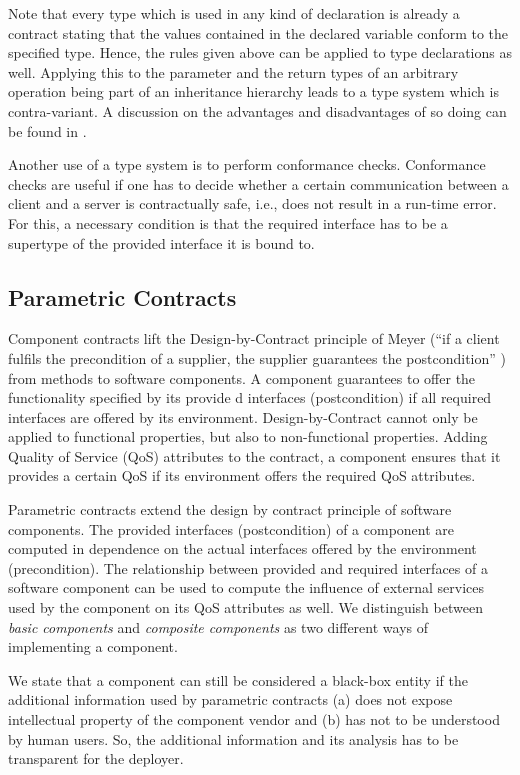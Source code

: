 Note that every type which is used in any kind of declaration is already a contract stating that the values contained in the declared variable conform to the specified type. Hence, the rules given above can be applied to type declarations as well. Applying this to the parameter and the return types of an arbitrary operation being part of an inheritance hierarchy leads to a type system which is contra-variant. A discussion on the advantages and disadvantages of so doing can be found in \cite[p. 628ff]{meyer1997a}.

Another use of a type system is to perform conformance checks. Conformance checks are useful if one has to decide whether a certain communication between a client and a server is contractually safe, i.e., does not result in a run-time error. For this, a necessary condition is that the required interface has to be a supertype of the provided interface it is bound to. 

\subsection{Parametric Contracts}

Component contracts lift the Design-by-Contract principle of Meyer (``if a
client fulfils the precondition of a supplier, the supplier guarantees the
postcondition'' \cite{meyer1992a}) from methods to software components. A
component guarantees to offer the functionality specified by its provide
d interfaces (postcondition) if all required interfaces are offered by its
environment. Design-by-Contract cannot only be applied to
functional properties, but also to non-functional properties. Adding Quality of
Service (QoS) attributes to the contract, a component ensures that it
provides a certain QoS if its environment offers the required QoS attributes. 

Parametric contracts \cite{reussner2002c} extend the design by contract
principle of software components. The provided interfaces (postcondition) of a
component are computed in dependence on the actual interfaces offered by the
environment (precondition). The relationship between provided and required
interfaces of a software component can be used to compute the influence of
external services used by the component on its QoS attributes as well. We
distinguish between \emph{basic components} and \emph{composite components} as
two different ways of implementing a component.

We state that a component can still be considered a black-box entity if the
additional information used by parametric contracts (a) does not expose
intellectual property of the component vendor and (b) has not to be understood
by human users. So, the additional information and its analysis has to be
transparent for the deployer.

